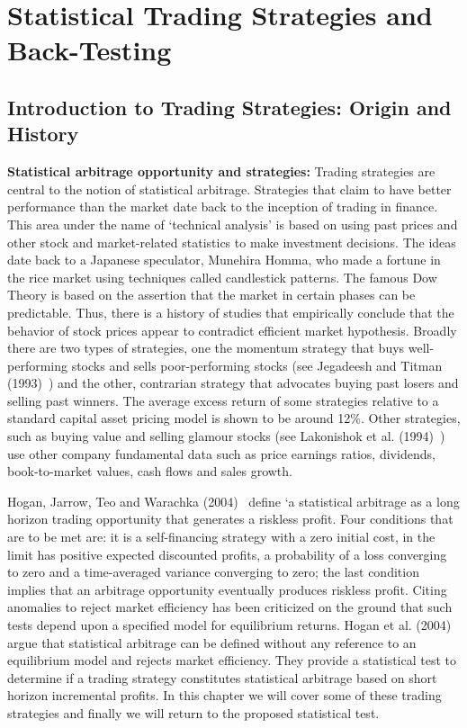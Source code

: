\chapter{Statistical Trading Strategies and Back-Testing}

\section{Introduction to Trading Strategies: Origin and History}

\noindent \textbf{Statistical arbitrage opportunity and strategies:} Trading strategies are central to the notion of statistical arbitrage. Strategies that claim to have better performance than the market date back to the inception of trading in finance. This area under the name of `technical analysis' is based on using past prices and other stock and market-related statistics to make investment decisions. The ideas date back to a Japanese speculator, Munehira Homma, who made a fortune in the rice market using techniques called candlestick patterns. The famous Dow Theory is based on the assertion that the market in certain phases can be predictable. Thus, there is a history of studies that empirically conclude that the behavior of stock prices appear to contradict efficient market hypothesis. Broadly there are two types of strategies, one the momentum strategy that buys well-performing stocks and sells poor-performing stocks (see Jegadeesh and Titman (1993)~\cite{JeTit}) and the other, contrarian strategy that advocates buying past losers and selling past winners. The average excess return of some strategies relative to a standard capital asset pricing model is shown to be around 12\%. Other strategies, such as buying value and selling glamour stocks (see Lakonishok et al. (1994)~\cite{Lako}) use other company fundamental data such as price earnings ratios, dividends, book-to-market values, cash flows and sales growth.


Hogan, Jarrow, Teo and Warachka (2004)~\cite{Hogan} define `a statistical arbitrage as a long horizon trading opportunity that generates a riskless profit. Four conditions that are to be met are: it is a self-financing strategy with a zero initial cost, in the limit has positive expected discounted profits, a probability of a loss converging to zero and a time-averaged variance converging to zero; the last condition implies that an arbitrage opportunity eventually produces riskless profit. Citing anomalies to reject  market efficiency has been criticized on the ground that such tests depend upon a specified model for equilibrium returns. Hogan et al. (2004)~\cite{Hogan} argue that statistical arbitrage can be defined without any reference to an equilibrium model and rejects market efficiency. They provide a statistical test to determine if a trading strategy constitutes statistical arbitrage based on short horizon incremental profits. In this chapter we will cover some of these trading strategies and finally we will return to the proposed statistical test.


